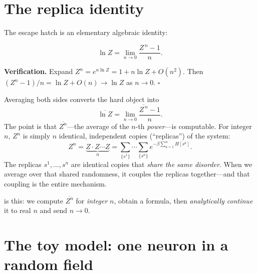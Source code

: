 \documentclass[nobib,justified]{tufte-handout}
\newcommand{\dbar}[1]{\overline{#1}}            %
\begin{document}
\section{The replica identity}

The escape hatch is an elementary algebraic identity:
\begin{keyresult}
\[
  \ln Z = \lim_{n\to 0}\frac{Z^{\,n}-1}{n}.
\]
\end{keyresult}
\noindent
\textbf{Verification.} Expand $Z^n = e^{n\ln Z} = 1 + n\ln Z + O(n^2)$.
Then $(Z^n-1)/n = \ln Z + O(n) \to \ln Z$ as $n\to 0$. \hfill$\square$

\medskip
Averaging both sides converts the hard object into
\[
  \dbar{\ln Z} = \lim_{n\to 0}\frac{\dbar{Z^{\,n}}-1}{n}.
\]
The point is that $\dbar{Z^n}$---the average of the $n$-th
\emph{power}---is computable. For integer $n$, $Z^n$ is simply $n$
identical, independent copies (``replicas'') of the system:
\[
  Z^n = \underbrace{Z\cdot Z\cdots Z}_{n}
      = \sum_{\{s^1\}}\!\cdots\!\sum_{\{s^n\}}
        e^{-\beta\sum_{a=1}^n H[s^a]}.
\]
The replicas $s^1,\dots,s^n$ are identical copies that \emph{share the
same disorder}. When we average over that shared randomness, it couples
the replicas together---and that coupling is the entire mechanism.

 is this: we compute $\dbar{Z^n}$ for
\emph{integer} $n$, obtain a formula, then \emph{analytically continue} it
to real $n$ and send $n\to 0$.

\section{The toy model: one neuron in a random field}

\end{document}
